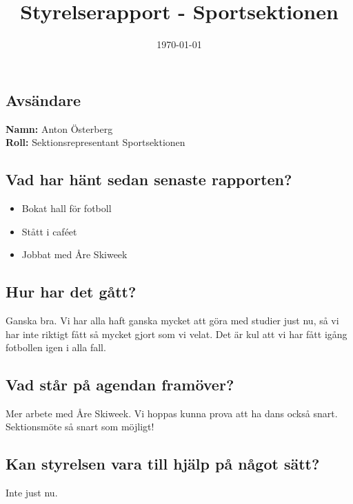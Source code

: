 \documentclass[a4paper]{article}
\begin{document}
	\title{Styrelserapport - Sportsektionen}
	\date{\today}
	\maketitle

	\subsection{Avsändare}
		\textbf{Namn:} Anton Österberg\\
		\textbf{Roll:} Sektionsrepresentant Sportsektionen\\
	\subsection{Vad har hänt sedan senaste rapporten?}
	\begin{itemize}
		\item Bokat hall för fotboll
		\item Stått i caféet
		\item Jobbat med Åre Skiweek
	\end{itemize}
	\subsection{Hur har det gått?}
	Ganska bra. Vi har alla haft ganska mycket att göra med studier just nu, så vi har inte riktigt fått så mycket gjort som vi velat. Det är kul att vi har fått igång fotbollen igen i alla fall.
	\subsection{Vad står på agendan framöver?}
	Mer arbete med Åre Skiweek. Vi hoppas kunna prova att ha dans också snart. Sektionsmöte så snart som möjligt!
	\subsection{Kan styrelsen vara till hjälp på något sätt?}
	Inte just nu.
\end{document}
